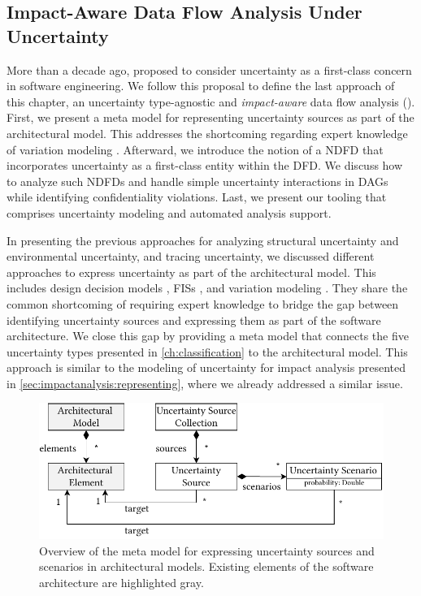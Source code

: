\subsection{Impact-Aware Data Flow Analysis Under Uncertainty}%
\label{sec:confidentialityanalysis:abunai}

More than a decade ago, \textcite{garlan_software_2010} proposed to consider uncertainty as a first-class concern in software engineering.
We follow this proposal to define the last approach of this chapter, an uncertainty type-agnostic and \emph{impact-aware} data flow analysis ().
First, we present a meta model for representing uncertainty sources as part of the architectural model.
This addresses the shortcoming regarding expert knowledge of variation modeling \cite{mehl_palladio_2022,walter_architecture-based_2023,hahner_model-based_2023}.
Afterward, we introduce the notion of a \acf{NDFD} \cite{hahner_classification_2023} that incorporates uncertainty as a first-class entity within the \ac{DFD}.
We discuss how to analyze such \acp{NDFD} and handle simple uncertainty interactions in \acp{DAG} while identifying confidentiality violations.
Last, we present our tooling \abunai that comprises uncertainty modeling and automated analysis support.

In presenting the previous approaches for analyzing structural uncertainty and environmental uncertainty, and tracing uncertainty, we discussed different approaches to express uncertainty as part of the architectural model.
This includes design decision models \cite{koziolek_peropteryx_2011,koziolek_automated_2011,walter_architectural_2022}, \acp{FIS} \cite{klir_fuzzy_1995,boltz_handling_2022}, and variation modeling \cite{mehl_palladio_2022,hahner_model-based_2023}.
They share the common shortcoming of requiring expert knowledge to bridge the gap between identifying uncertainty sources and expressing them as part of the software architecture.
We close this gap by providing a meta model that connects the five uncertainty types presented in \autoref{ch:classification} to the architectural model.
This approach is similar to the modeling of uncertainty for impact analysis presented in \autoref{sec:impactanalysis:representing}, where we already addressed a similar issue.

\begin{figure}
    \centering
    \includegraphics[width=0.95\linewidth]{figures/chapter7/abunai-metamodel.pdf}
    \caption{Overview of the meta model for expressing uncertainty sources and scenarios in architectural models. Existing elements of the software architecture are highlighted gray.}
    \label{fig:confidentialityanalysis:uncertaintymetamodel}
\end{figure}

